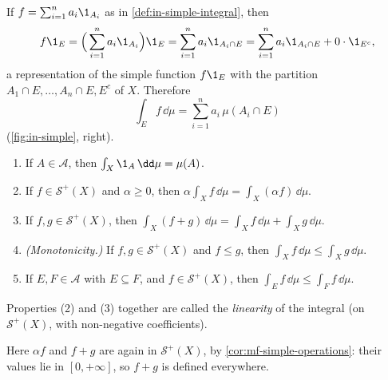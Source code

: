 If $f=\sum_{i=1}^na_i\1_{A_i}$ as in \cref{def:in-simple-integral}, then
\[
  f\1_E=\Big(\sum_{i=1}^na_i\1_{A_i}\Big)\1_E=\sum_{i=1}^na_i\1_{A_i\cap E}
  =\sum_{i=1}^na_i\1_{A_i\cap E}+0\cdot\1_{E^c},
\]
a representation of the simple function $f\1_E$ with the partition
$A_1\cap E,\dots,A_n\cap E,E^c$ of $X$. Therefore
\[
  \int_Ef\,\dd\mu=\sum_{i=1}^na_i\,\mu(A_i\cap E)
\]
(\cref{fig:in-simple}, right).

\begin{proposition}[Properties]\label{prop:in-simple-properties}
\begin{enumerate}[label=(\arabic*)]
  \item If $A\in\mathcal A$, then $\int_X\1_A\,\dd\mu=\mu(A)$.
  \item If $f\in\mathcal S^+(X)$ and $\alpha\ge0$, then $\alpha\int_Xf\,\dd\mu=\int_X(\alpha
    f)\,\dd\mu$.
  \item If $f,g\in\mathcal S^+(X)$, then $\int_X(f+g)\,\dd\mu=\int_Xf\,\dd\mu+\int_Xg\,\dd\mu$.
  \item \emph{(Monotonicity.)} If $f,g\in\mathcal S^+(X)$ and $f\le g$, then
    $\int_Xf\,\dd\mu\le\int_Xg\,\dd\mu$.
  \item If $E,F\in\mathcal A$ with $E\subseteq F$, and $f\in\mathcal S^+(X)$, then
    $\int_Ef\,\dd\mu\le\int_Ff\,\dd\mu$.
\end{enumerate}
Properties (2) and (3) together are called the \emph{linearity} of the integral (on
$\mathcal S^+(X)$, with non-negative coefficients).
\end{proposition}

Here $\alpha f$ and $f+g$ are again in $\mathcal S^+(X)$, by \cref{cor:mf-simple-operations}:
their values lie in $[0,+\infty]$, so $f+g$ is defined everywhere.

